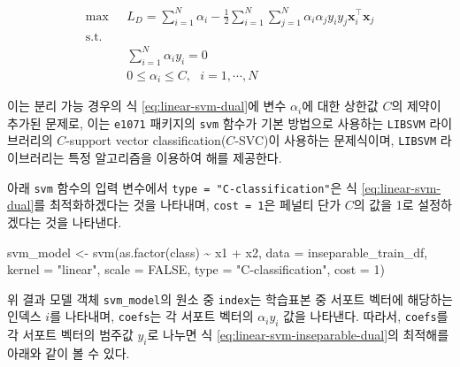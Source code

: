 \documentclass[
]{book}
\newenvironment{Shaded}{\begin{snugshade}}{\end{snugshade}}
\newcommand{\AttributeTok}[1]{\textcolor[rgb]{0.77,0.63,0.00}{#1}}
\newcommand{\ConstantTok}[1]{\textcolor[rgb]{0.00,0.00,0.00}{#1}}
\newcommand{\DecValTok}[1]{\textcolor[rgb]{0.00,0.00,0.81}{#1}}
\newcommand{\FunctionTok}[1]{\textcolor[rgb]{0.00,0.00,0.00}{#1}}
\newcommand{\NormalTok}[1]{#1}
\newcommand{\OtherTok}[1]{\textcolor[rgb]{0.56,0.35,0.01}{#1}}
\newcommand{\SpecialCharTok}[1]{\textcolor[rgb]{0.00,0.00,0.00}{#1}}
\newcommand{\StringTok}[1]{\textcolor[rgb]{0.31,0.60,0.02}{#1}}
\begin{document}
\begin{equation}
\begin{split}
\max \text{  } & L_D = \sum_{i = 1}^{N} \alpha_i - \frac{1}{2} \sum_{i = 1}^{N} \sum_{j = 1}^{N} \alpha_i \alpha_j y_i y_j \mathbf{x}_i^\top \mathbf{x}_j\\
\text{s.t. } &\\
& \sum_{i = 1}^{N} \alpha_i y_i = 0\\
& 0 \le \alpha_i \le C, \text{  } i = 1, \cdots, N
\end{split}
\label{eq:linear-svm-inseparable-dual}
\end{equation}

이는 분리 가능 경우의 식 \eqref{eq:linear-svm-dual}에 변수 \(\alpha_i\)에 대한 상한값 \(C\)의 제약이 추가된 문제로, 이는 \texttt{e1071} 패키지의 \texttt{svm} 함수가 기본 방법으로 사용하는 \texttt{LIBSVM} 라이브러리\citep{chang2011libsvm}의 \(C\)-support vector classification(\(C\)-SVC)이 사용하는 문제식이며, \texttt{LIBSVM} 라이브러리는 특정 알고리즘\citep{fan2005working}을 이용하여 해를 제공한다.

아래 \texttt{svm} 함수의 입력 변수에서 \texttt{type\ =\ "C-classification"}은 식 \eqref{eq:linear-svm-dual}를 최적화하겠다는 것을 나타내며, \texttt{cost\ =\ 1}은 페널티 단가 \(C\)의 값을 1로 설정하겠다는 것을 나타낸다.

\begin{Shaded}
\begin{Highlighting}[]
\NormalTok{svm\_model }\OtherTok{\textless{}{-}} \FunctionTok{svm}\NormalTok{(}\FunctionTok{as.factor}\NormalTok{(class) }\SpecialCharTok{\textasciitilde{}}\NormalTok{ x1 }\SpecialCharTok{+}\NormalTok{ x2, }\AttributeTok{data =}\NormalTok{ inseparable\_train\_df,}
                 \AttributeTok{kernel =} \StringTok{"linear"}\NormalTok{, }\AttributeTok{scale =} \ConstantTok{FALSE}\NormalTok{,}
                 \AttributeTok{type =} \StringTok{"C{-}classification"}\NormalTok{, }\AttributeTok{cost =} \DecValTok{1}\NormalTok{)}
\end{Highlighting}
\end{Shaded}

위 결과 모델 객체 \texttt{svm\_model}의 원소 중 \texttt{index}는 학습표본 중 서포트 벡터에 해당하는 인덱스 \(i\)를 나타내며, \texttt{coefs}는 각 서포트 벡터의 \(\alpha_i y_i\) 값을 나타낸다. 따라서, \texttt{coefs}를 각 서포트 벡터의 범주값 \(y_i\)로 나누면 식 \eqref{eq:linear-svm-inseparable-dual}의 최적해를 아래와 같이 볼 수 있다.
\end{document}
